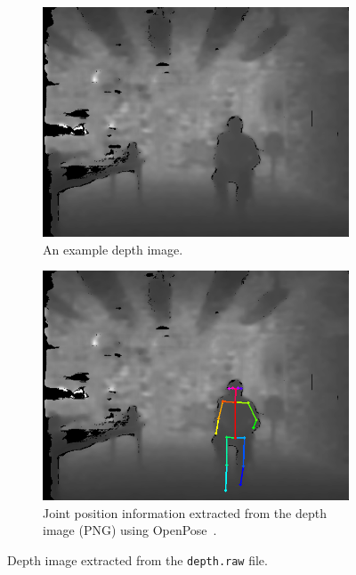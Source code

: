 \begin{figure}[H]
    \centering
    \begin{subfigure}[t]{0.49\textwidth}
        \includegraphics[width=\textwidth]{fig/4/depth-image.png}
        \caption{An example depth image.}
        \label{fig:depth-camera-frame}
    \end{subfigure}
    \hfill
    \begin{subfigure}[t]{0.49\textwidth}
        \includegraphics[width=\textwidth]{fig/4/depth-image-skeleton.png}
        \caption{Joint position information extracted from the depth image (PNG) using OpenPose~\cite{openpose}.}
        \label{fig:depth-camera-frame-skeleton}
    \end{subfigure}
    \caption{Depth image extracted from the \texttt{depth.raw} file.}
\end{figure}

